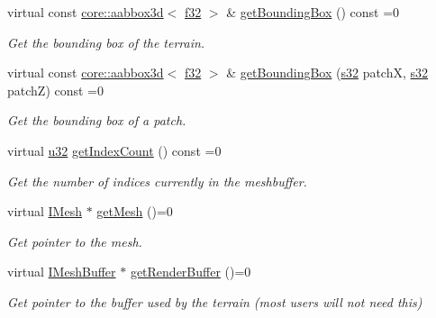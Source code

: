 \begin{DoxyCompactItemize}
virtual const \hyperlink{classirr_1_1core_1_1aabbox3d}{core\+::aabbox3d}$<$ \hyperlink{namespaceirr_a0277be98d67dc26ff93b1a6a1d086b07}{f32} $>$ \& \hyperlink{classirr_1_1scene_1_1ITerrainSceneNode_a02a14fe28f5a326fca819c36bee2e92e}{get\+Bounding\+Box} () const =0
\begin{DoxyCompactList}\small\item\em Get the bounding box of the terrain. \end{DoxyCompactList}\item 
virtual const \hyperlink{classirr_1_1core_1_1aabbox3d}{core\+::aabbox3d}$<$ \hyperlink{namespaceirr_a0277be98d67dc26ff93b1a6a1d086b07}{f32} $>$ \& \hyperlink{classirr_1_1scene_1_1ITerrainSceneNode_a383501cc9c5cd30176f1f7ff6f8ab817}{get\+Bounding\+Box} (\hyperlink{namespaceirr_ac66849b7a6ed16e30ebede579f9b47c6}{s32} patchX, \hyperlink{namespaceirr_ac66849b7a6ed16e30ebede579f9b47c6}{s32} patchZ) const =0
\begin{DoxyCompactList}\small\item\em Get the bounding box of a patch. \end{DoxyCompactList}\item 
virtual \hyperlink{namespaceirr_a0416a53257075833e7002efd0a18e804}{u32} \hyperlink{classirr_1_1scene_1_1ITerrainSceneNode_a0f09a8260f325570ce58f0fc6993aff9}{get\+Index\+Count} () const =0
\begin{DoxyCompactList}\small\item\em Get the number of indices currently in the meshbuffer. \end{DoxyCompactList}\item 
virtual \hyperlink{classirr_1_1scene_1_1IMesh}{I\+Mesh} $\ast$ \hyperlink{classirr_1_1scene_1_1ITerrainSceneNode_a6b5f5fca80e77f392e23d83dc61ae88e}{get\+Mesh} ()=0
\begin{DoxyCompactList}\small\item\em Get pointer to the mesh. \end{DoxyCompactList}\item 
\mbox{\label{classirr_1_1scene_1_1ITerrainSceneNode_a3383e2d453c22c31091ad8652de2bb8a}} 
virtual \hyperlink{classirr_1_1scene_1_1IMeshBuffer}{I\+Mesh\+Buffer} $\ast$ \hyperlink{classirr_1_1scene_1_1ITerrainSceneNode_a3383e2d453c22c31091ad8652de2bb8a}{get\+Render\+Buffer} ()=0
\begin{DoxyCompactList}\small\item\em Get pointer to the buffer used by the terrain (most users will not need this) \end{DoxyCompactList}\item 

\end{DoxyCompactItemize}
